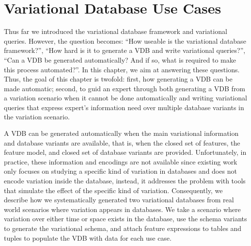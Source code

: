 \chapter{Variational Database Use Cases}
\label{ch:vdbusecase}

Thus far we introduced the variational database framework and variational
queries. However, the question becomes: ``How useable is the variational
database framework?'', ``How hard is it to generate a VDB and write 
variational queries?'', ``Can a VDB be generated automatically? And if so,
what is required to make this process automated?''. 
%
In this chapter, we aim at answering these questions.
Thus, the goal of this chapter is twofold: 
first, how generating a VDB can be made automatic;
second, to guid an expert through both generating a VDB
from a variation scenario when it cannot be done automatically and
writing variational queries that express expert's information need over
multiple database variants in the variation scenario.
%

A VDB can be generated automatically when the main variational information and
database variants are available, that is, when the closed set of features, the
feature model, and closed set of database variants are provided.
%
Unfortunately, in practice, these information and encodings are not available 
since existing work only focuses on studying a specific 
kind of variation in databases and does not encode variation inside the database,
instead, it addresses the problem with tools that simulate the effect of the
specific kind of variation.
Consequently, we describe how we systematically generated two 
variational databases from real world scenarios where variation appears
in databases. We take a scenario where variation over either time or space
exists in the database, use the schema variants to generate the variational schema, 
and attach feature expressions to tables and tuples to populate the VDB with
data for each use case. 


